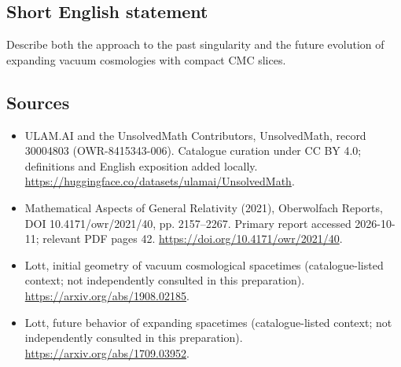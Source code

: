 \documentclass[11pt]{article}
\begin{document}
\subsection{Short English statement}
Describe both the approach to the past singularity and the future evolution of expanding vacuum cosmologies with compact CMC slices.
\subsection{Sources}
\begin{itemize}
\item[\hypertarget{source:30004803:1}{S1}] ULAM.AI and the UnsolvedMath Contributors, UnsolvedMath, record 30004803 (OWR-8415343-006). Catalogue curation under CC BY 4.0; definitions and English exposition added locally.
\url{https://huggingface.co/datasets/ulamai/UnsolvedMath}.
\item[\hypertarget{source:30004803:2}{S2}] Mathematical Aspects of General Relativity (2021), Oberwolfach Reports, DOI 10.4171/owr/2021/40, pp. 2157--2267. Primary report accessed 2026-10-11; relevant PDF pages 42.
\url{https://doi.org/10.4171/owr/2021/40}.
\item[\hypertarget{source:30004803:3}{S3}] Lott, initial geometry of vacuum cosmological spacetimes (catalogue-listed context; not independently consulted in this preparation).
\url{https://arxiv.org/abs/1908.02185}.
\item[\hypertarget{source:30004803:4}{S4}] Lott, future behavior of expanding spacetimes (catalogue-listed context; not independently consulted in this preparation).
\url{https://arxiv.org/abs/1709.03952}.
\end{itemize}
\label{end:30004803}
\end{document}
